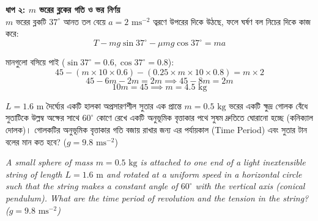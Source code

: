\documentclass[12pt, a4paper]{article}
\begin{document}
{{\begin{tcolorbox}[solutionbox={সমাধান (Solution)}]
    \vspace{0.5em}
    \noindent\textbf{ধাপ ২: $m$ ভরের ব্লকের গতি ও ভর নির্ণয়} \\
    $m$ ভরের ব্লকটি $37^\circ$ আনত তল বেয়ে $a = 2\text{ ms}^{-2}$ ত্বরণে উপরের দিকে উঠছে, ফলে ঘর্ষণ বল নিচের দিকে কাজ করে:
    \[ T - mg \sin 37^\circ - \mu mg \cos 37^\circ = m a \]
    
    মানগুলো বসিয়ে পাই ($\sin 37^\circ = 0.6, \cos 37^\circ = 0.8$):
    \[ 45 - (m \times 10 \times 0.6) - (0.25 \times m \times 10 \times 0.8) = m \times 2 \]
    \[ 45 - 6m - 2m = 2m \implies 45 - 8m = 2m \]
    \[ 10m = 45 \implies m = \mathbf{4.5}\text{ kg} \]
\end{tcolorbox}

\newpage

\begin{tcolorbox}[questionbox={প্রশ্ন (Question) 48}]
    \noindent
    $L = 1.6\text{ m}$ দৈর্ঘ্যের একটি হালকা অপ্রসারণশীল সুতার এক প্রান্তে $m = 0.5\text{ kg}$ ভরের একটি ক্ষুদ্র গোলক বেঁধে সুতাটিকে উল্লম্ব অক্ষের সাথে $60^\circ$ কোণে রেখে একটি অনুভূমিক বৃত্তাকার পথে সুষম দ্রুতিতে ঘোরানো হচ্ছে (কনিক্যাল দোলক)। গোলকটির অনুভূমিক বৃত্তাকার গতি বজায় রাখার জন্য এর পর্যায়কাল (Time Period) এবং সুতার টান বলের মান কত হবে? ($g = 9.8\text{ ms}^{-2}$)
    
    \vspace{0.8em}
    \begin{english}
    \noindent\textit{\color{darkgray}
    A small sphere of mass $m = 0.5\text{ kg}$ is attached to one end of a light inextensible string of length $L = 1.6\text{ m}$ and rotated at a uniform speed in a horizontal circle such that the string makes a constant angle of $60^\circ$ with the vertical axis (conical pendulum). What are the time period of revolution and the tension in the string? ($g = 9.8\text{ ms}^{-2}$)
    }
    \end{english}
\end{tcolorbox}

\vspace{1em}
\begin{center}
\end{center}}}
\end{document}
